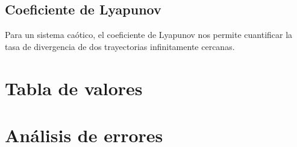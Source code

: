 \documentclass[11pt, twoside]{article} %
\begin{document}
\subsection{Coeficiente de Lyapunov}

Para un sistema caótico, el coeficiente de Lyapunov nos permite
cuantificar la tasa de divergencia de dos trayectorias infinitamente
cercanas.



\newpage

\appendix

\section{Tabla de valores}


\newpage

\section{Análisis de errores}
\end{document}
